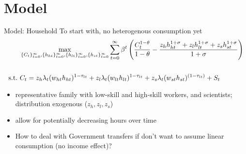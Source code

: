 \documentclass[11pt,aspectratio=169]{beamer}
\begin{document}
\section{Model}
\begin{frame}{Model: Household}
\alert{	To start with, no heterogenous consumption yet}\\
\begin{align*}
& \max_{\{C_t\}_{t=0}^\infty, \{h_{ht}\}_{t=0}^\infty, \{h_{lt}\}_{t=0}^\infty, \{h_{st}\}_{t=0}^\infty} \sum_{t=0}^\infty \beta^t \left(\frac{C_t^{1-\theta}}{1-\theta}-\frac{z_hh_{ht}^{1+\sigma}+z_lh_{lt}^{1+\sigma}+z_sh_{st}^{1+\sigma}}{1+\sigma}\right) %
\\
\vspace{3mm}
\\
\text{s.t.}\ \vspace{4mm}& C_t=z_h \lambda_t (w_{ht}h_{ht})^{1-\tau_{lt}}+z_l \lambda_t (w_{lt}h_{lt})^{1-\tau_{lt}}+z_s\lambda_t(w_{st}h_{st})^{(1-\tau_{lt})}+S_t\\
\end{align*}
\vspace{-15mm}
\begin{itemize}
	\item<+-> representative family with low-skill and high-skill workers, and scientists; distribution exogenous ($z_h,z_l, z_s$)
	\vspace{2mm}
	\item<+-> allow for potentially decreasing hours over time \citep{Boppart2019LaborPerspectiveb}
	\vspace{2mm}
	\item<+-> How to deal with Government transfers if don't want to assume linear consumption (no income effect)?
\end{itemize}
\end{frame}
\end{document}
